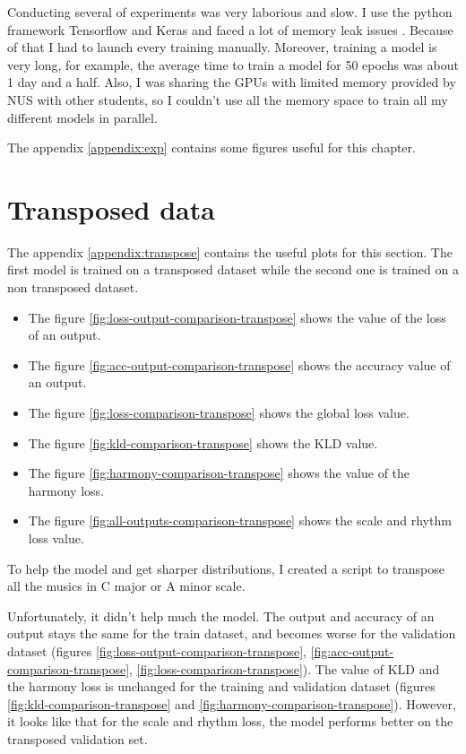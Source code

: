 \documentclass[12pt]{report}
\begin{document}
Conducting several of experiments was very laborious and slow.
I use the python framework Tensorflow \cite{noauthor_tensorflow_nodate} and Keras \cite{noauthor_keras_nodate} and faced a lot of memory leak issues \cite{noauthor_memory_nodate-1, noauthor_memory_nodate-2}.
Because of that I had to launch every training manually.
Moreover, training a model is very long, for example, the average time to train a model for 50 epochs was about 1 day and a half.
Also, I was sharing the GPUs with limited memory provided by NUS with other students, so I couldn't use all the memory space to train all my different models in parallel.

The appendix \ref{appendix:exp} contains some figures useful for this chapter.

\section{Transposed data}
\label{sec:exp:transpose}

The appendix \ref{appendix:transpose} contains the useful plots for this section.
The first model is trained on a transposed dataset while the second one is trained on a non transposed dataset.
\begin{itemize}
    \item The figure \ref{fig:loss-output-comparison-transpose} shows the value of the loss of an output.
    \item The figure \ref{fig:acc-output-comparison-transpose} shows the accuracy value of an output.
    \item The figure \ref{fig:loss-comparison-transpose} shows the global loss value.
    \item The figure \ref{fig:kld-comparison-transpose} shows the KLD value.
    \item The figure \ref{fig:harmony-comparison-transpose} shows the value of the harmony loss.
    \item The figure \ref{fig:all-outputs-comparison-transpose} shows the scale and rhythm loss value.
\end{itemize}
To help the model and get sharper distributions, I created a script to transpose all the musics in C major or A minor scale.

Unfortunately, it didn't help much the model.
The output and accuracy of an output stays the same for the train dataset, and becomes worse for the validation dataset (figures \ref{fig:loss-output-comparison-transpose}, \ref{fig:acc-output-comparison-transpose}, \ref{fig:loss-comparison-transpose}).
The value of KLD and the harmony loss is unchanged for the training and validation dataset (figures \ref{fig:kld-comparison-transpose} and \ref{fig:harmony-comparison-transpose}).
However, it looks like that for the scale and rhythm loss, the model performs better on the transposed validation set.
\end{document}
